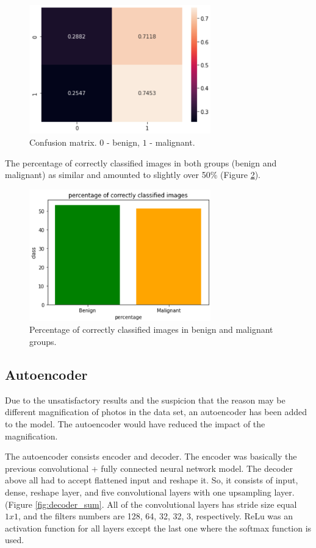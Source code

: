 \documentclass[12pt]{article}
\begin{document}
\begin{figure}[!ht]
\centering
\includegraphics[width=0.7\textwidth]{matrix.png}
\caption{\label{fig:matrix}Confusion matrix. $0$ - benign, $1$ - malignant.}
\end{figure}

The percentage of correctly classified images in both groups (benign and malignant) as similar and amounted to slightly over 50\% (Figure \ref{fig:corr_class}).

\begin{figure}[!ht]
\centering
\includegraphics[width=0.7\textwidth]{corr_class.png}
\caption{\label{fig:corr_class}Percentage of correctly classified images in benign and malignant groups.}
\end{figure}


\subsection{Autoencoder}
Due to the unsatisfactory results and the suspicion that the reason may be different magnification of photos in the data set, an autoencoder has been added to the model. The autoencoder would have reduced the impact of the magnification.

The autoencoder consists encoder and decoder. The encoder was basically the previous convolutional + fully connected neural network model. The decoder above all had to accept flattened input and reshape it. So, it consists of input, dense, reshape layer, and five convolutional layers with one upsampling layer.(Figure \ref{fig:decoder_sum}. All of the convolutional layers has stride size equal $1 x 1$, and the filters numbers are 128, 64, 32, 32, 3, respectively. ReLu was an activation function for all layers except the last one where the softmax function is used.
\end{document}
